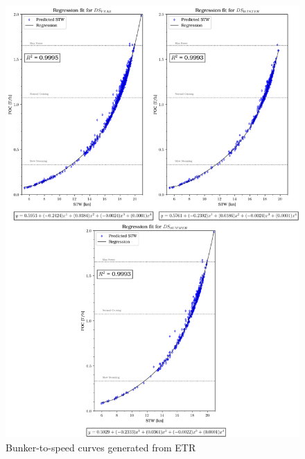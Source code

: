 \newpage

\begin{figure}[h!]
    \centering
    \includegraphics[width=.9\linewidth]{02_figures/poly_etr_combi.png}
    \caption{Bunker-to-speed curves generated from ETR}
    \label{fig:FOC_plot_etr_combi}
\end{figure}

\newpage

